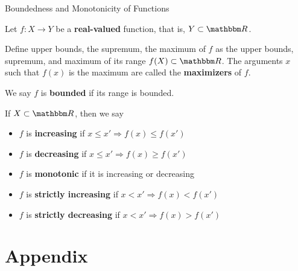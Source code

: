 \documentclass[9pt,aspectratio=169]{beamer}
\newcommand{\RR}{\mathbbm R}
\renewcommand{\implies}{\Rightarrow}
\begin{document}
\begin{frame}[allowframebreaks]{Boundedness and Monotonicity of Functions}
    \begin{definition}
        Let $f: X \to Y$ be a \textbf{real-valued} function, that is, $Y
        \subset \RR$.

        Define upper bounds, the supremum, the maximum of $f$ as the upper
        bounds, supremum, and maximum of its range $f(X) \subset \RR$. The
        arguments $x$ such that $f(x)$ is the maximum are called the
        \textbf{maximizers} of $f$.

        We say $f$ is \textbf{bounded} if its range is bounded.
    \end{definition}
    \framebreak
    \begin{definition}
        If $X \subset \RR$, then we say
        \begin{itemize}
            \item $f$ is \textbf{increasing} if $x \leq x' \implies f(x) \leq
            f(x')$
            \item $f$ is \textbf{decreasing} if $x \leq x' \implies f(x) \geq
            f(x')$
            \item $f$ is \textbf{monotonic} if it is increasing or decreasing
            \item $f$ is \textbf{strictly increasing} if $x < x' \implies f(x) <
            f(x')$
            \item $f$ is \textbf{strictly decreasing} if $x < x' \implies f(x)
            > f(x')$
        \end{itemize}
    \end{definition}
\end{frame}


\section{Appendix}
\end{document}
